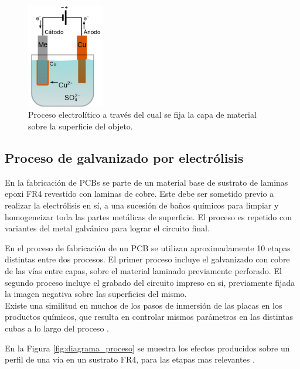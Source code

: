 \begin{figure}[h]
	\centering
	\includegraphics[width=0.3\textwidth]{Figures/Cap_2/galvanizado_copper_electroplating}
	\caption{Proceso electrolítico a través del cual se fija la capa de material sobre la superficie del objeto.}
	\label{fig:copper_electroplating}
\end{figure}


\subsection{ Proceso de galvanizado por electrólisis }

En la fabricación de PCBs se parte de un material base de sustrato de laminas epoxi FR4 revestido con laminas de cobre. Este debe ser sometido previo a realizar la electrólisis en sí, a una sucesión de baños químicos para limpiar y homogeneizar toda las partes metálicas de superficie. El proceso es repetido con variantes del metal galvánico para lograr el circuito final. 

En el proceso de fabricación de un PCB se utilizan aproximadamente 10 etapas distintas entre dos procesos. El primer proceso incluye el galvanizado con cobre de las vías entre capas, sobre el material laminado previamente perforado. El segundo proceso incluye el grabado del circuito impreso en si, previamente fijada la imagen negativa sobre las superficies del mismo.\\

Existe una similitud en muchos de los pasos de inmersión de las placas en los productos químicos, que resulta en controlar mismos parámetros en las distintas cubas a lo largo del proceso \citep{sase_mayer} \citep{make_pcb}. 

En la Figura \ref{fig:diagrama_proceso} se muestra los efectos producidos sobre un perfil de una vía en un sustrato FR4, para las etapas mas relevantes \footnotemark.

